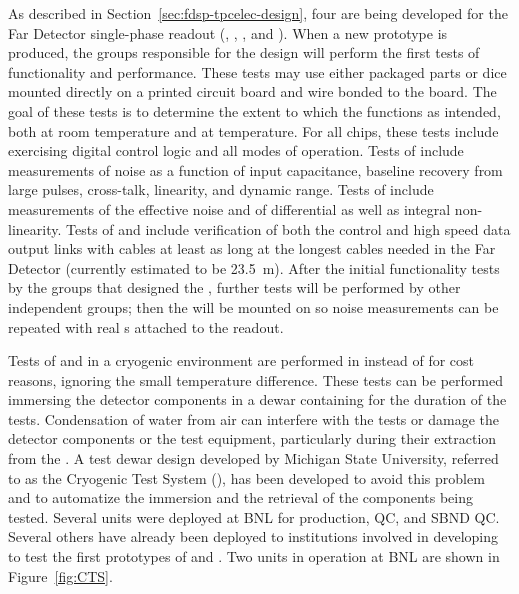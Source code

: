 As described in Section~\ref{sec:fdsp-tpcelec-design}, four  
are being developed for the  Far Detector single-phase  readout 
(, , , and ). 
When a new prototype  is produced, the groups responsible for the  design will perform the first tests of 
 functionality and performance. These tests may use either 
packaged parts or dice mounted directly on a printed circuit board 
and wire bonded to the board.  The goal of these tests is to determine 
the extent to which the  functions as intended, both at room 
temperature and at \lntwo temperature.  For all chips, these tests 
include exercising digital control logic and all modes of operation. Tests 
of   include measurements of noise as a function 
of input capacitance, baseline recovery from large pulses, cross-talk, linearity, 
and dynamic range. Tests of  include measurements of the effective noise and 
of differential as well as integral non-linearity. Tests of  and  
include verification of both the control and high speed data output links with 
cables at least as long at the longest cables needed in the  Far Detector 
(currently estimated to be \SI{23.5}{m}). After the initial functionality
tests by the groups that designed the , further
tests will be performed by other independent groups; then the 
will be mounted on  so noise measurements can be repeated
with real s attached to the readout.

Tests of  and in a cryogenic environment
are performed in \lntwo instead of \lar for cost reasons, ignoring
the small temperature difference. These tests can be performed immersing
the detector components in a dewar containing \lntwo for the duration
of the tests. Condensation of water from air can interfere with
the tests or damage the detector components or the test equipment,
particularly during their extraction from the \lntwo. A test dewar
design developed by Michigan State University, referred to as the
Cryogenic Test System (), has been developed to avoid
this problem and to automatize the immersion and the retrieval of 
the components being tested. Several  units
were deployed at BNL for  production,  QC, and SBND  QC.
Several others have already been deployed to institutions involved in
developing  to test the first prototypes of 
and . Two  units in operation at BNL are 
shown in Figure~\ref{fig:CTS}.

